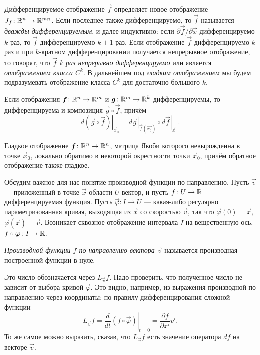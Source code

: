 Дифференцируемое отображение $\vec{f}$ определяет новое отображение $J_{\boldsymbol{f}}\colon \mathbb{R}^n \to \mathbb{R}^{mn}$. Если последнее также дифференцируемо, то $\vec{f}$ называется \textit{дважды дифференцируемым}, и далее индуктивно: если $\partial\vec{f} / \partial\vec{x}$ дифференцируемо $k$ раз, то $\vec{f}$ дифференцируемо $k + 1$ раз. Если отображение $\vec{f}$ дифференцируемо $k$ раз и при $k$-кратном дифференцировании получается непрерывное отображение, то говорят, что $\vec{f}$ \textit{$k$ раз непрерывно дифференцируемо} или является \textit{отображением класса $C^k$}. В дальнейшем под \textit{гладким отображением} мы будем подразумевать отображение класса $C^k$ для достаточно большого $k$.

\begin{theorem}
	Если отображения $\boldsymbol{f}\colon \mathbb{R}^n \to \mathbb{R}^m$ и $\boldsymbol{g}\colon \mathbb{R}^m \to \mathbb{R}^k$ дифференцируемы, то дифференцируема и композиция $\vec{g} \circ \vec{f}$, причём
	\[
		\left.d(\vec{g} \circ \vec{f})\right|_{\vec{x}_0} = \left.d\vec{g}\right|_{\vec{f}(\vec{x_0})} \circ \left.d\vec{f}\right|_{\vec{x}_0}.
	\]
\end{theorem}

\begin{theorem}
	Гладкое отображение $\boldsymbol{f}\colon \mathbb{R}^n \to \mathbb{R}^n$, матрица Якоби которого невырожденна в точке $\vec{x}_0$, локально обратимо в некоторой окрестности точки $\vec{x}_0$, причём обратное отображение также гладкое.
\end{theorem}

Обсудим важное для нас понятие производной функции по направлению. Пусть $\vec{v}$ --- приложенный в точке $\vec{x}$ области $U$ вектор, и пусть $f\colon U \to \mathbb{R}$ --- дифференцируемая функция. Пусть $\vec{\varphi}\colon I \to U$ --- какая-либо регулярно параметризованная кривая\footnotemark, выходящая из $\vec{x}$ со скоростью $\vec{v}$, так что $\vec{\varphi}(0) = \vec{x}$, $\dot{\vec{\varphi}}(\vec{x}) = \vec{v}$. Возникает сквозное отображение интервала $I$ на вещественную ось, $f \circ \boldsymbol{\varphi}\colon I \to \mathbb{R}$.


\begin{definition}
	\textit{Производной функции $f$ по направлению вектора $\vec{v}$} называется производная построенной функции в нуле.
\end{definition}

Это число обозначается через $L_{\vec{v}}f$. Надо проверить, что полученное число не зависит от выбора кривой $\vec{\varphi}$. Это видно, например, из выражения производной по направлению через координаты: по правилу дифференцирования сложной функции
\[
	L_{\vec{v}}f = \left.\frac{d}{dt}(f \circ \vec{\varphi})\right|_{t = 0} = \frac{\partial f}{\partial x^i}v^i.
\]
То же самое можно выразить, сказав, что $L_{\vec{v}}f$ есть значение оператора $df$ на векторе $\vec{v}$.

